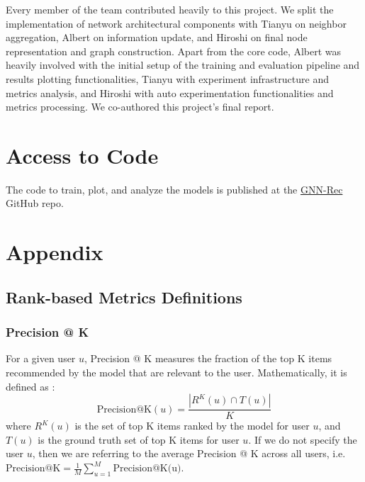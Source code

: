 \documentclass{article}
\begin{document}
Every member of the team contributed heavily to this project. We split the implementation of network architectural components with Tianyu on neighbor aggregation, Albert on information update, and Hiroshi on final node representation and graph construction. Apart from the core code, Albert was heavily involved with the initial setup of the training and evaluation pipeline and results plotting functionalities, Tianyu with experiment infrastructure and metrics analysis, and Hiroshi with auto experimentation functionalities and metrics processing. We co-authored this project's final report.

\section{Access to Code}


The code to train, plot, and analyze the models is published at the \href{https://github.com/thisisalbertliang/gnn-rec}{GNN-Rec} GitHub repo.

\newpage

\section{Appendix}


\subsection{Rank-based Metrics Definitions} \label{rank-metrics-def}

\subsubsection{Precision @ K}

For a given user $u$, Precision @ K measures the fraction of the top K items recommended by the model that are relevant to the user. Mathematically, it is defined as \cite{survey}:
$$
\mbox{Precision@K}(u) = \frac{| R^K(u) \cap T(u) |}{K}
$$
where $R^K(u)$ is the set of top K items ranked by the model for user $u$, and $T(u)$ is the ground truth set of top K items for user $u$. If we do not specify the user $u$, then we are referring to the average Precision @ K across all users, i.e. $\mbox{Precision@K} = \frac{1}{M} \sum_{u = 1}^M \mbox{Precision@K(u)}$.
\end{document}
